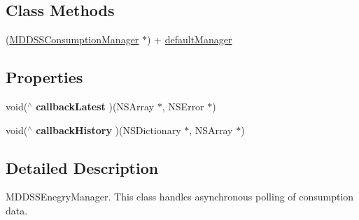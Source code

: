 \subsection*{Class Methods}
\begin{DoxyCompactItemize}
\item 
(\hyperlink{interface_m_d_d_s_s_consumption_manager}{M\-D\-D\-S\-S\-Consumption\-Manager} $\ast$) + \hyperlink{interface_m_d_d_s_s_consumption_manager_ac7a7890115eff0ddaf1e4022d474f4bc}{default\-Manager}
\end{DoxyCompactItemize}
\subsection*{Properties}
\begin{DoxyCompactItemize}
\item 
\hypertarget{interface_m_d_d_s_s_consumption_manager_a911f8a05a99ca741b5e36c59bab6f85f}{void($^\wedge$ {\bfseries callback\-Latest} )(N\-S\-Array $\ast$, N\-S\-Error $\ast$)}\label{interface_m_d_d_s_s_consumption_manager_a911f8a05a99ca741b5e36c59bab6f85f}

\item 
\hypertarget{interface_m_d_d_s_s_consumption_manager_a710c4c8abe3ecfb0555ae66cd7c0d938}{void($^\wedge$ {\bfseries callback\-History} )(N\-S\-Dictionary $\ast$, N\-S\-Array $\ast$)}\label{interface_m_d_d_s_s_consumption_manager_a710c4c8abe3ecfb0555ae66cd7c0d938}

\end{DoxyCompactItemize}


\subsection{Detailed Description}
M\-D\-D\-S\-S\-Enegry\-Manager. This class handles asynchronous polling of consumption data. 

